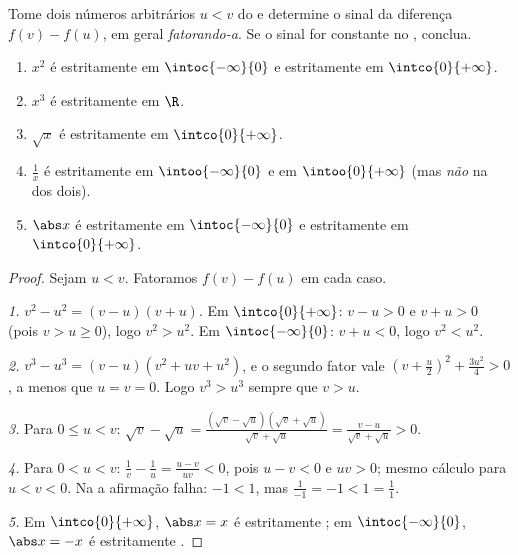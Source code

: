 \begin{method}\label{met:g11:func:variation}
Tome dois números arbitrários $u < v$ do  e determine o sinal da
diferença $f(v) - f(u)$, em geral \emph{fatorando-a}. Se o sinal for
constante no , conclua.
\end{method}

\begin{proposition}\label{prop:g11:func:refvariations}
\begin{enumerate}
  \item $x^2$ é estritamente  em $\intoc{-\infty}{0}$ e
        estritamente  em $\intco{0}{+\infty}$.
  \item $x^3$ é estritamente  em $\R$.
  \item $\sqrt x$ é estritamente  em $\intco{0}{+\infty}$.
  \item $\frac1x$ é estritamente  em $\intoo{-\infty}{0}$ e em
        $\intoo{0}{+\infty}$ (mas \emph{não} na  dos dois).
  \item $\abs x$ é estritamente  em $\intoc{-\infty}{0}$ e
        estritamente  em $\intco{0}{+\infty}$.
\end{enumerate}
\end{proposition}

\begin{proof}
Sejam $u < v$. Fatoramos $f(v) - f(u)$ em cada caso.

\emph{1.} $v^2 - u^2 = (v-u)(v+u)$. Em $\intco{0}{+\infty}$: $v - u > 0$
e $v + u > 0$ (pois $v > u \geq 0$), logo $v^2 > u^2$. Em
$\intoc{-\infty}{0}$: $v + u < 0$, logo $v^2 < u^2$.

\emph{2.} $v^3 - u^3 = (v - u)(v^2 + uv + u^2)$, e o segundo fator vale
$\left(v + \frac u2\right)^2 + \frac{3u^2}{4} > 0$, a menos que
$u = v = 0$. Logo $v^3 > u^3$ sempre que $v > u$.

\emph{3.} Para $0 \leq u < v$:
$\sqrt v - \sqrt u = \frac{(\sqrt v - \sqrt u)(\sqrt v + \sqrt u)}
{\sqrt v + \sqrt u} = \frac{v - u}{\sqrt v + \sqrt u} > 0$.

\emph{4.} Para $0 < u < v$: $\frac1v - \frac1u = \frac{u - v}{uv} < 0$,
pois $u - v < 0$ e $uv > 0$; mesmo cálculo para $u < v < 0$. Na  a
afirmação falha: $-1 < 1$, mas $\frac{1}{-1} = -1 < 1 = \frac11$.

\emph{5.} Em $\intco{0}{+\infty}$, $\abs x = x$ é estritamente
; em $\intoc{-\infty}{0}$, $\abs x = -x$ é estritamente
.
\end{proof}

